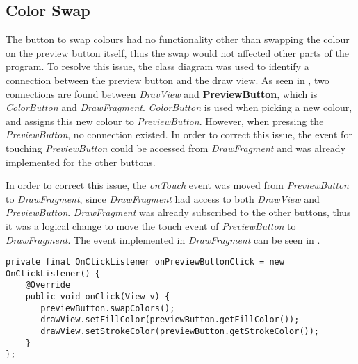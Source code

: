 \subsection{Color Swap}
The button to swap colours had no functionality other than swapping the colour on the preview button itself, thus the swap would not affected other parts of the program.
To resolve this issue, the class diagram was used to identify a connection between the preview button and the draw view.
As seen in , two connections are found between \textit{DravView} and \textbf{PreviewButton}, which is \textit{ColorButton} and \textit{DrawFragment}.
\textit{ColorButton} is used when picking a new colour, and assigns this new colour to \textit{PreviewButton}.
However, when pressing the \textit{PreviewButton}, no connection existed.
In order to correct this issue, the event for touching \textit{PreviewButton} could be accessed from \textit{DrawFragment} and was already implemented for the other buttons. 

In order to correct this issue, the \textit{onTouch} event was moved from \textit{PreviewButton} to \textit{DrawFragment}, since \textit{DrawFragment} had access to both \textit{DrawView} and \textit{PreviewButton}.
\textit{DrawFragment} was already subscribed to the other buttons, thus it was a logical change to move the touch event of \textit{PreviewButton} to \textit{DrawFragment}.
The event implemented in \textit{DrawFragment} can be seen in .

\begin{lstlisting}[caption={onPreviewButtonClick event},label=lst:event-previewbuttonclick]
private final OnClickListener onPreviewButtonClick = new OnClickListener() {
    @Override
    public void onClick(View v) {
       previewButton.swapColors();
       drawView.setFillColor(previewButton.getFillColor());
       drawView.setStrokeColor(previewButton.getStrokeColor());
    }
};
\end{lstlisting}
